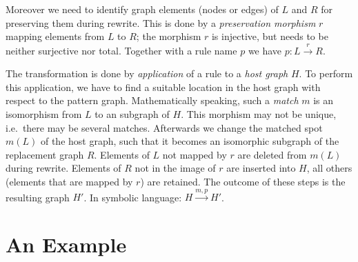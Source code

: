 Moreover we need to identify graph elements (nodes or edges) of $L$ and $R$ for preserving them during rewrite. 
This is done by a \emph{preservation morphism} $r$ mapping elements from $L$ to $R$; the morphism $r$ is injective, but needs to be neither surjective nor total.
Together with a rule name $p$ we have $p : L \xrightarrow{r} R$.

The transformation is done by \emph{application} of a rule to a \emph{host graph} $H$.
To perform this application, we have to find a suitable location in the host graph with respect to the pattern graph.
Mathematically speaking, such a \emph{match} $m$ is an isomorphism from $L$ to an subgraph of $H$.
This morphism may not be unique, i.e.\ there may be several matches.
Afterwards we change the matched spot $m(L)$ of the host graph, such that it becomes an isomorphic subgraph of the replacement graph $R$.
Elements of $L$ not mapped by $r$ are deleted from $m(L)$ during rewrite.
Elements of $R$ not in the image of $r$ are inserted into $H$, all others (elements that are mapped by $r$) are retained.
The outcome of these steps is the resulting graph $H'$. In symbolic language: $H \xrightarrow{m,p} H'$.


\section{An Example}
\label{ov:example}

